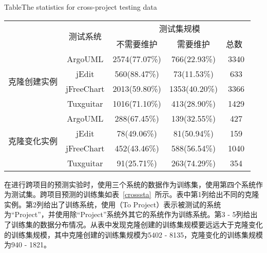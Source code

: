 \begin{table}[h]
{Table$\!$}{The statistics for cross-project testing data}
\vspace{0.5em}
\centering
\wuhao
\begin{tabular}{ccccc}
\toprule[1.5pt]
~\multirow{2}{*}{类型}&\multirow{2}{*}{测试系统}&\multicolumn{3}{c}{测试集规模}\\
~&~&{不需要维护}&{需要维护}&{总数}~\\
\midrule[1pt]
\multirow{4}{*}{克隆创建实例}
&ArgoUML&	2574(77.07\%)&	766(22.93\%)&	3340\\
&jEdit&560(88.47\%)&	73(11.53\%)&	633\\
&jFreeChart&	2013(59.80\%)&	1353(40.20\%)&	3366\\
&Tuxguitar&	1016(71.10\%)&	413(28.90\%)&	1429\\
\multirow{4}{*}{克隆变化实例}
&ArgoUML&288(67.45\%)&139(32.55\%)&427\\
&jEdit&78(49.06\%)&81(50.94\%)&159\\
&jFreeChart&452(43.46\%)&588(56.54\%)&1040\\
&Tuxguitar&91(25.71\%)&263(74.29\%)&354\\
\bottomrule[1.5pt]
\end{tabular}
\end{table}

在进行跨项目的预测实验时，使用三个系统的数据作为训练集，使用第四个系统作为测试集。跨项目预测的训练集如表~\ref{crosssta}~所示。表中第1列给出不同的克隆实例。第2列给出了训练系统，使用（To Project）表示被测试的系统为“Project”，并使用除“Project”系统外其它的系统作为训练系统。第3 - 5列给出了训练集的数据分布情况。从表中发现克隆创建的训练集规模要远远大于克隆变化的训练集规模，其中克隆创建的训练集规模为5402 - 8135，克隆变化的训练集规模为940 - 1821。

